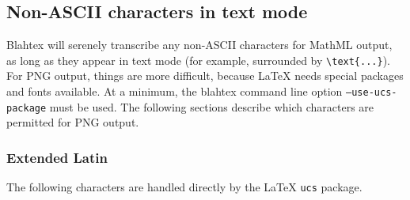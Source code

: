 \documentclass{article}
\newcommand{\texcommand}[1]{\textbackslash{}#1}
\begin{document}


\subsection{Non-ASCII characters in text mode}\label{sec:non-ascii-characters}

Blahtex will serenely transcribe any non-ASCII characters for MathML output, as long as they appear in text mode (for example, surrounded by \texttt{\texcommand{text}\{...\}}). For PNG output, things are more difficult, because \LaTeX{} needs special packages and fonts available. At a minimum, the blahtex command line option \texttt{--use-ucs-package} must be used. The following sections describe which characters are permitted for PNG output.

\subsubsection{Extended Latin}

The following characters are handled directly by the \LaTeX{} \texttt{ucs} package.
\end{document}
